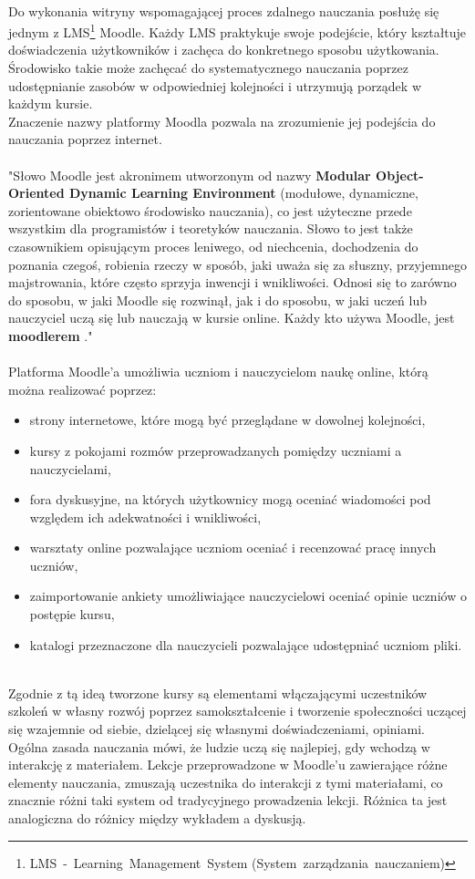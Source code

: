 \ \\
Do wykonania witryny wspomagającej proces zdalnego nauczania posłużę się jednym z LMS\footnote{LMS~-~Learning~Management~System (System~zarządzania~nauczaniem)} Moodle. Każdy LMS praktykuje swoje podejście, który kształtuje doświadczenia użytkowników i zachęca do konkretnego sposobu użytkowania. Środowisko takie może zachęcać do systematycznego nauczania poprzez udostępnianie zasobów w odpowiedniej kolejności i utrzymują porządek w każdym kursie. \\
Znaczenie nazwy platformy Moodla pozwala na zrozumienie jej podejścia do nauczania poprzez internet. \\
\ \\
"Słowo Moodle jest akronimem utworzonym od nazwy \textbf{Modular Object-Oriented Dynamic Learning Environment} (modułowe, dynamiczne, zorientowane obiektowo środowisko nauczania), co jest użyteczne przede wszystkim dla programistów i teoretyków nauczania. Słowo to jest także czasownikiem opisującym proces leniwego, od niechcenia, dochodzenia do poznania czegoś, robienia rzeczy w sposób, jaki uważa się za słuszny, przyjemnego majstrowania, które często sprzyja inwencji i wnikliwości. Odnosi się to zarówno do sposobu, w jaki Moodle się rozwinął, jak i do sposobu, w jaki uczeń lub nauczyciel uczą się lub nauczają w kursie online. Każdy kto używa Moodle, jest \textbf{moodlerem} ." \cite{dokumentacja_moodle} \\
\ \\
Platforma Moodle'a umożliwia uczniom i nauczycielom naukę online, którą można realizować poprzez: \\
	\begin{itemize}
		\item strony internetowe, które mogą być przeglądane w dowolnej kolejności,
		\item kursy z pokojami rozmów przeprowadzanych pomiędzy uczniami a nauczycielami,
		\item fora dyskusyjne, na których użytkownicy mogą oceniać wiadomości pod względem ich adekwatności i wnikliwości,
		\item warsztaty online pozwalające uczniom oceniać i recenzować pracę innych uczniów,
		\item zaimportowanie ankiety umożliwiające nauczycielowi oceniać opinie uczniów o postępie kursu,
		\item katalogi przeznaczone dla nauczycieli pozwalające udostępniać uczniom pliki.
	\end{itemize}
\ \\
Zgodnie z tą ideą tworzone kursy są elementami włączającymi uczestników szkoleń w własny rozwój poprzez samokształcenie i tworzenie społeczności uczącej się wzajemnie od siebie, dzielącej się własnymi doświadczeniami, opiniami. Ogólna zasada nauczania mówi, że ludzie uczą się najlepiej, gdy wchodzą w interakcję z materiałem. Lekcje przeprowadzone w Moodle'u zawierające różne elementy nauczania, zmuszają uczestnika do interakcji z tymi materiałami, co znacznie różni taki system od tradycyjnego prowadzenia lekcji. Różnica ta jest analogiczna do różnicy między wykładem a dyskusją. \\
